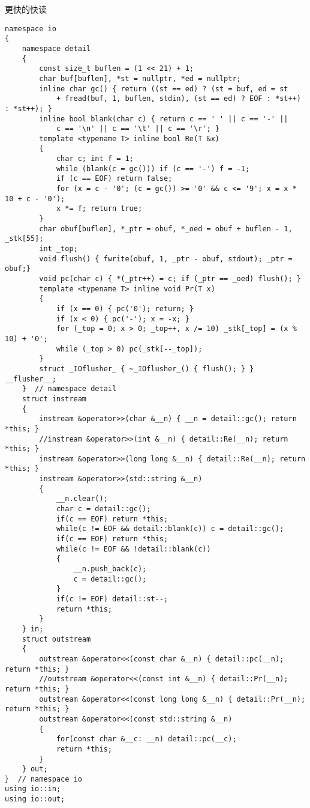 \documentclass[a4paper]{ctexart}
\begin{document}
更快的快读

\begin{lstlisting}
namespace io 
{
    namespace detail 
    {
        const size_t buflen = (1 << 21) + 1;
        char buf[buflen], *st = nullptr, *ed = nullptr;
        inline char gc() { return ((st == ed) ? (st = buf, ed = st 
            + fread(buf, 1, buflen, stdin), (st == ed) ? EOF : *st++) : *st++); }
        inline bool blank(char c) { return c == ' ' || c == '-' || 
            c == '\n' || c == '\t' || c == '\r'; }
        template <typename T> inline bool Re(T &x) 
        {
            char c; int f = 1;
            while (blank(c = gc())) if (c == '-') f = -1;
            if (c == EOF) return false;
            for (x = c - '0'; (c = gc()) >= '0' && c <= '9'; x = x * 10 + c - '0');
            x *= f; return true;
        }
        char obuf[buflen], *_ptr = obuf, *_oed = obuf + buflen - 1, _stk[55];
        int _top;
        void flush() { fwrite(obuf, 1, _ptr - obuf, stdout); _ptr = obuf;}
        void pc(char c) { *(_ptr++) = c; if (_ptr == _oed) flush(); }
        template <typename T> inline void Pr(T x) 
        {
            if (x == 0) { pc('0'); return; }
            if (x < 0) { pc('-'); x = -x; }
            for (_top = 0; x > 0; _top++, x /= 10) _stk[_top] = (x % 10) + '0';
            while (_top > 0) pc(_stk[--_top]);
        } 
        struct _IOflusher_ { ~_IOflusher_() { flush(); } } __flusher__;
    }  // namespace detail
    struct instream 
    {
        instream &operator>>(char &__n) { __n = detail::gc(); return *this; }
        //instream &operator>>(int &__n) { detail::Re(__n); return *this; }
        instream &operator>>(long long &__n) { detail::Re(__n); return *this; }
        instream &operator>>(std::string &__n) 
        {
            __n.clear();
            char c = detail::gc();
            if(c == EOF) return *this;
            while(c != EOF && detail::blank(c)) c = detail::gc();
            if(c == EOF) return *this;
            while(c != EOF && !detail::blank(c)) 
            {
                __n.push_back(c);
                c = detail::gc();
            }
            if(c != EOF) detail::st--;
            return *this;
        }
    } in;
    struct outstream 
    {
        outstream &operator<<(const char &__n) { detail::pc(__n); return *this; }
        //outstream &operator<<(const int &__n) { detail::Pr(__n); return *this; }
        outstream &operator<<(const long long &__n) { detail::Pr(__n); return *this; }
        outstream &operator<<(const std::string &__n) 
        {
            for(const char &__c: __n) detail::pc(__c);
            return *this;
        }
    } out;
}  // namespace io
using io::in;
using io::out;
\end{lstlisting}
\end{document}
